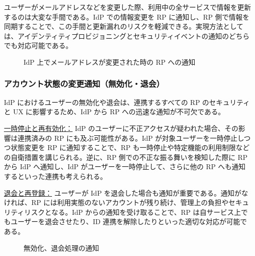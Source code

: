 \documentclass[uplatex]{jsarticle}
\def\label#1{}%
\begin{document}
ユーザーがメールアドレスなどを変更した際、利用中の全サービスで情報を更新するのは大変な手間である。IdP での情報変更を RP に通知し、RP 側で情報を同期することで、この手間と更新漏れのリスクを軽減できる。実現方法としては、アイデンティティプロビジョニングとセキュリティイベントの通知のどちらでも対応可能である。

\begin{figure}[H]
\centering
{}
\caption{IdP 上でメールアドレスが変更された時の RP への通知}
\label{fig:ch4-email-change-notification}
\end{figure}

\subsubsection{アカウント状態の変更通知（無効化・退会）}

IdP におけるユーザーの無効化や退会は、連携するすべての RP のセキュリティと UX に影響するため、IdP から RP への迅速な通知が不可欠である。

\underline{一時停止と再有効化：}
IdP のユーザーに不正アクセスが疑われた場合、その影響は連携済みの RP にも及ぶ可能性がある。IdP が対象ユーザーを一時停止しつつ状態変更を RP に通知することで、RP も一時停止や特定機能の利用制限などの自衛措置を講じられる。逆に、RP 側での不正な振る舞いを検知した際に RP から IdP へ通知し、IdP がユーザーを一時停止して、さらに他の RP へも通知するといった連携も考えられる。

\underline{退会と再登録：}
ユーザーが IdP を退会した場合も通知が重要である。通知がなければ、RP には利用実態のないアカウントが残り続け、管理上の負担やセキュリティリスクとなる。IdP からの通知を受け取ることで、RP は自サービス上でもユーザーを退会させたり、ID 連携を解除したりといった適切な対応が可能である。

\begin{figure}[H]
\centering
{}
\caption{無効化、退会処理の通知}
\label{fig:ch4-state-change-notification}
\end{figure}
\end{document}
